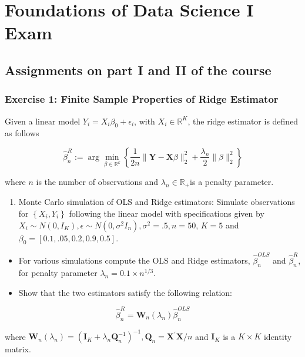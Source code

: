 \section{Foundations of Data Science I Exam}
\subsection{Assignments on part I and II of the course}
\subsubsection{Exercise 1: Finite Sample Properties of Ridge Estimator}
Given a linear model $Y_{i}=X_{i} \beta_{0}+\epsilon_{i}$, with $X_{i} \in \mathbb{R}^{K}$, the ridge estimator is defined as follows


\begin{equation}
\hat{\beta}_{n}^{R}:=\arg \min _{\beta \in \mathbb{R}^{k}}\left\{\frac{1}{2 n}\|\boldsymbol{Y}-\boldsymbol{X} \beta\|_{2}^{2}+\frac{\lambda_{n}}{2}\|\beta\|_{2}^{2}\right\} \label{eq:beta-Hat}
\end{equation}


where $n$ is the number of observations and $\lambda_{n} \in \mathbb{R}_{+}$is a penalty parameter.

\begin{enumerate}
  \item Monte Carlo simulation of OLS and Ridge estimators: Simulate observations for $\left\{X_{i}, Y_{i}\right\}$ following the linear model with specifications given by $X_{i} \sim N\left(0, I_{K}\right), \epsilon \sim N\left(0, \sigma^{2} I_{n}\right), \sigma^{2}=.5, n=50$, $K=5$ and $\beta_{0}=[0.1, .05,0.2,0.9,0.5]$.
\end{enumerate}

\begin{itemize}
  \item For various simulations compute the OLS and Ridge estimators, $\hat{\beta}_{n}^{O L S}$ and $\hat{\beta}_{n}^{R}$, for penalty parameter $\lambda_{n}=0.1 \times n^{1 / 3}$.
  \item Show that the two estimators satisfy the following relation:
\end{itemize}

$$
\hat{\beta}_{n}^{R}=\boldsymbol{W}_{n}\left(\lambda_{n}\right) \hat{\beta}_{n}^{O L S}
$$

where $\boldsymbol{W}_{n}\left(\lambda_{n}\right)=\left(\boldsymbol{I}_{K}+\lambda_{n} \boldsymbol{Q}_{n}^{-1}\right)^{-1}, \boldsymbol{Q}_{n}=\boldsymbol{X}^{\prime} \boldsymbol{X} / n$ and $\boldsymbol{I}_{K}$ is a $K \times K$ identity matrix.

